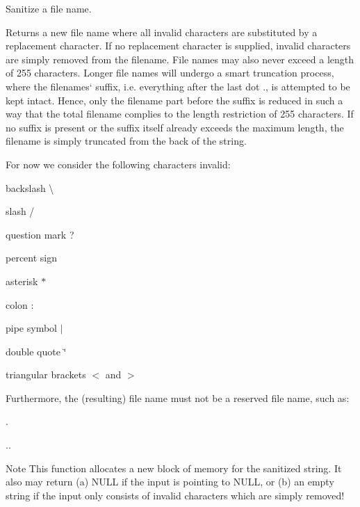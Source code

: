 Sanitize a file name. 

Returns a new file name where all invalid characters are substituted by a replacement character. If no replacement character is supplied, invalid characters are simply removed from the filename. File names may also never exceed a length of 255 characters. Longer file names will undergo a \textquotesingle{}smart\textquotesingle{} truncation process, where the filenames` suffix, i.\+e. everything after the last dot \textquotesingle{}.\textquotesingle{}, is attempted to be kept intact. Hence, only the filename part before the suffix is reduced in such a way that the total filename complies to the length restriction of 255 characters. If no suffix is present or the suffix itself already exceeds the maximum length, the filename is simply truncated from the back of the string.

For now we consider the following characters invalid\+:
\begin{DoxyItemize}
\item backslash \textquotesingle{}\textbackslash{}\textquotesingle{}
\item slash \textquotesingle{}/\textquotesingle{}
\item question mark \textquotesingle{}?\textquotesingle{}
\item percent sign \textquotesingle{}\textquotesingle{}
\item asterisk \textquotesingle{}$\ast$\textquotesingle{}
\item colon \textquotesingle{}\+:\textquotesingle{}
\item pipe symbol \textquotesingle{}$\vert$\textquotesingle{}
\item double quote \textquotesingle{}\char`\"{}\textquotesingle{}
\item triangular brackets \textquotesingle{}$<$\textquotesingle{} and \textquotesingle{}$>$\textquotesingle{}
\end{DoxyItemize}

Furthermore, the (resulting) file name must not be a reserved file name, such as\+:
\begin{DoxyItemize}
\item \textquotesingle{}.\textquotesingle{}
\item \textquotesingle{}..\textquotesingle{}
\end{DoxyItemize}

\begin{DoxyNote}{Note}
This function allocates a new block of memory for the sanitized string. It also may return (a) N\+U\+LL if the input is pointing to N\+U\+LL, or (b) an empty string if the input only consists of invalid characters which are simply removed!
\end{DoxyNote}

